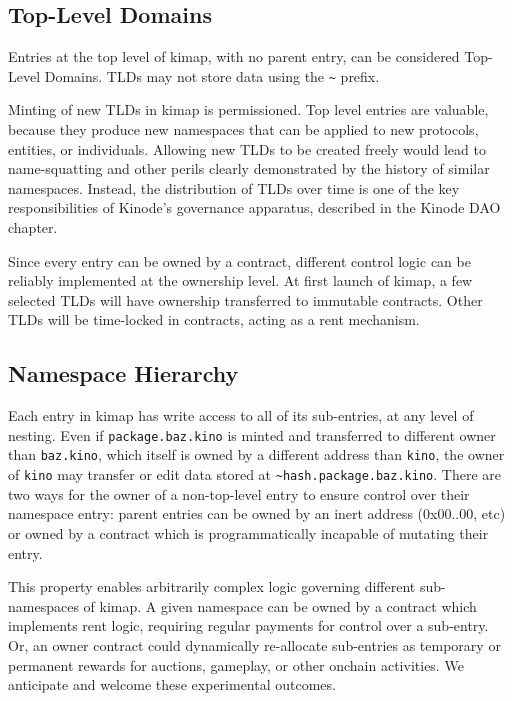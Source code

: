 \documentclass[runningheads]{llncs}
\begin{document}
\subsection{Top-Level Domains}

Entries at the top level of kimap, with no parent entry, can be considered Top-Level Domains.
TLDs may not store data using the \verb|~| prefix.

Minting of new TLDs in kimap is permissioned.
Top level entries are valuable, because they produce new namespaces that can be applied to new protocols, entities, or individuals.
Allowing new TLDs to be created freely would lead to name-squatting and other perils clearly demonstrated by the history of similar namespaces.
Instead, the distribution of TLDs over time is one of the key responsibilities of Kinode's governance apparatus, described in the Kinode DAO chapter.

Since every entry can be owned by a contract, different control logic can be reliably implemented at the ownership level.
At first launch of kimap, a few selected TLDs will have ownership transferred to immutable contracts.
Other TLDs will be time-locked in contracts, acting as a rent mechanism.

\subsection{Namespace Hierarchy}

Each entry in kimap has write access to all of its sub-entries, at any level of nesting.
Even if \verb|package.baz.kino| is minted and transferred to different owner than \verb|baz.kino|, which itself is owned by a different address than \verb|kino|, the owner of \verb|kino| may transfer or edit data stored at \verb|~hash.package.baz.kino|.
There are two ways for the owner of a non-top-level entry to ensure control over their namespace entry: parent entries can be owned by an inert address (0x00..00, etc) or owned by a contract which is programmatically incapable of mutating their entry.

This property enables arbitrarily complex logic governing different sub-namespaces of kimap.
A given namespace can be owned by a contract which implements rent logic, requiring regular payments for control over a sub-entry.
Or, an owner contract could dynamically re-allocate sub-entries as temporary or permanent rewards for auctions, gameplay, or other onchain activities.
We anticipate and welcome these experimental outcomes.
\end{document}
